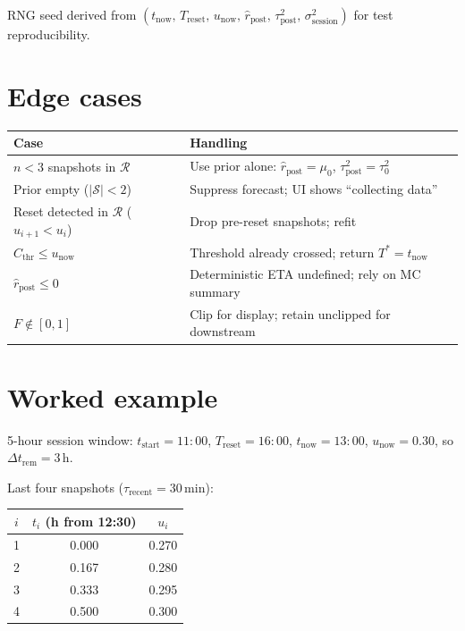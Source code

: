 \documentclass[11pt]{article}
\newcommand{\rpost}{\hat r_{\text{post}}}
\newcommand{\taupostsq}{\tau_{\text{post}}^2}
\newcommand{\tauzerosq}{\tau_0^2}
\newcommand{\sigsessionsq}{\sigma_{\text{session}}^2}
\newcommand{\unow}{u_{\text{now}}}
\newcommand{\tnow}{t_{\text{now}}}
\newcommand{\Treset}{T_{\text{reset}}}
\newcommand{\Dtrem}{\Delta t_{\text{rem}}}
\newcommand{\Cthr}{C_{\text{thr}}}
\newcommand{\taurecent}{\tau_{\text{recent}}}
\newcommand{\Tstar}{T^\ast}
\begin{document}
RNG seed derived from $(\tnow,\, \Treset,\, \unow,\, \rpost,\, \taupostsq,\,
\sigsessionsq)$ for test reproducibility.

\section{Edge cases}

\begin{center}
\begin{tabular}{@{}p{}p{}@{}}
\toprule
Case & Handling \\
\midrule
$n < 3$ snapshots in $\mathcal{R}$
  & Use prior alone: $\rpost = \mu_0$, $\taupostsq = \tauzerosq$ \\
Prior empty ($\lvert\mathcal{S}\rvert < 2$)
  & Suppress forecast; UI shows ``collecting data'' \\
Reset detected in $\mathcal{R}$ ($u_{i+1} < u_i$)
  & Drop pre-reset snapshots; refit \\
$\Cthr \leq \unow$
  & Threshold already crossed; return $\Tstar = \tnow$ \\
$\rpost \leq 0$
  & Deterministic ETA undefined; rely on MC summary \\
$F \notin [0, 1]$
  & Clip for display; retain unclipped for downstream \\
\bottomrule
\end{tabular}
\end{center}

\section{Worked example}

5-hour session window: $t_{\text{start}} = 11{:}00$, $\Treset = 16{:}00$,
$\tnow = 13{:}00$, $\unow = 0.30$, so $\Dtrem = 3$\,h.

Last four snapshots ($\taurecent = 30$\,min):

\begin{center}
\begin{tabular}{@{}ccc@{}}
\toprule
$i$ & $t_i$ (h from 12{:}30) & $u_i$ \\
\midrule
1 & 0.000 & 0.270 \\
2 & 0.167 & 0.280 \\
3 & 0.333 & 0.295 \\
4 & 0.500 & 0.300 \\
\bottomrule
\end{tabular}
\end{center}
\end{document}

